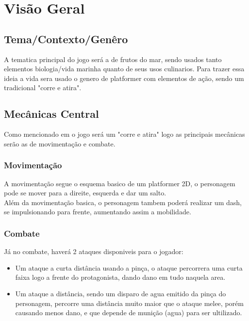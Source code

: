 
\section{Visão Geral}%
    \subsection{Tema/Contexto/Genêro}%
    \label{sec:contexto}
    A tematica principal do jogo será a de frutos do mar, sendo usados tanto elementos biologia/vida marinha quanto de seus usos culinarios.
    Para trazer essa ideia a vida sera usado o genero de platformer com elementos de ação, sendo um tradicional "corre e atira".\\

    \subsection{Mecânicas Central}%
    \label{sec:mecanica}
    Como mencionado em  o jogo será um "corre e atira" logo as principais mecânicas serão as de movimentação e combate.\\

        \subsubsection{Movimentação}\label{sec:mecanica:movimentação}
        A movimentação segue o esquema basico de um platformer 2D, o personagem pode se mover para a direite, esquerda e dar um salto.\\
        Além da movimentação basica, o personagem tambem poderá realizar um dash, se impulsionando para frente, aumentando assim a mobilidade.\\
        \subsubsection{Combate}\label{sec:mecanica:combate}
        Já no combate, haverá 2 ataques disponiveis para o jogador:

        \begin{itemize}
          \item Um ataque a curta distância usando a pinça, o ataque percorrera uma curta faixa logo a frente do protagonista, dando dano em tudo naquela area.
          \item Um ataque a distância, sendo um disparo de agua emitido da pinça do personagem, percorre uma distância muito maior que o ataque melee, porém causando menos dano, e que depende de munição (agua) para ser ultilizado.
        \end{itemize}

